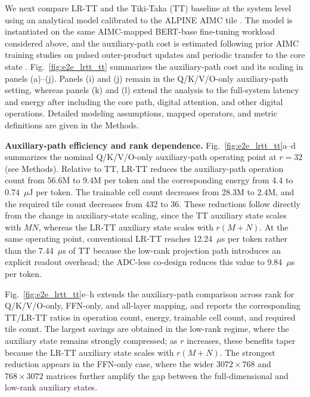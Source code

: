 \documentclass[fleqn,10pt]{wlscirep}
\begin{document}
\noindent
We next compare LR-TT and the Tiki-Taka (TT) baseline at the system level using an analytical model calibrated to the ALPINE AIMC tile \cite{klein2023alpine}. The model is instantiated on the same AIMC-mapped BERT-base fine-tuning workload considered above, and the auxiliary-path cost is estimated following prior AIMC training studies on pulsed outer-product updates and periodic transfer to the core state \cite{gokmen2016rpu,gokmen2020tikitaka,gokmen2021ttv2,rasch2024fastrobust}. Fig.~\ref{fig:e2e_lrtt_tt} summarizes the auxiliary-path cost and its scaling in panels (a)--(j). Panels (i) and (j) remain in the Q/K/V/O-only auxiliary-path setting, whereas panels (k) and (l) extend the analysis to the full-system latency and energy after including the core path, digital attention, and other digital operations. Detailed modeling assumptions, mapped operators, and metric definitions are given in the Methods.

\noindent\textbf{Auxiliary-path efficiency and rank dependence.}
Fig.~\ref{fig:e2e_lrtt_tt}a--d summarizes the nominal Q/K/V/O-only auxiliary-path operating point at \(r=32\) (see Methods). Relative to TT, LR-TT reduces the auxiliary-path operation count from 56.6M to 9.4M per token and the corresponding energy from 4.4 to 0.74~\(\mu\)J per token. The trainable cell count decreases from 28.3M to 2.4M, and the required tile count decreases from 432 to 36. These reductions follow directly from the change in auxiliary-state scaling, since the TT auxiliary state scales with \(MN\), whereas the LR-TT auxiliary state scales with \(r(M+N)\). At the same operating point, conventional LR-TT reaches 12.24~\(\mu\)s per token rather than the 7.44~\(\mu\)s of TT because the low-rank projection path introduces an explicit readout overhead; the ADC-less co-design reduces this value to 9.84~\(\mu\)s per token.

\noindent
Fig.~\ref{fig:e2e_lrtt_tt}e--h extends the auxiliary-path comparison across rank for Q/K/V/O-only, FFN-only, and all-layer mapping, and reports the corresponding TT/LR-TT ratios in operation count, energy, trainable cell count, and required tile count. The largest savings are obtained in the low-rank regime, where the auxiliary state remains strongly compressed; as \(r\) increases, these benefits taper because the LR-TT auxiliary state scales with \(r(M+N)\). The strongest reduction appears in the FFN-only case, where the wider \(3072\times768\) and \(768\times3072\) matrices further amplify the gap between the full-dimensional and low-rank auxiliary states.
\end{document}
